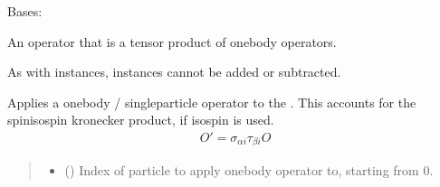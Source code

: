 \documentclass[letterpaper,10pt,english]{sphinxmanual}
\begin{document}
\begin{fulllineitems}
\label{\detokenize{spinbox:spinbox.core.ProductOperator}}
\pysigstartsignatures
{}
\pysigstopsignatures
\sphinxAtStartPar
Bases: 

\sphinxAtStartPar
An operator that is a tensor product of one\sphinxhyphen{}body operators.

\sphinxAtStartPar
As with  instances,  instances cannot be added or subtracted.

\begin{fulllineitems}
\label{\detokenize{spinbox:spinbox.core.ProductOperator.apply_onebody_operator}}
\pysigstartsignatures
{}
\pysigstopsignatures
\sphinxAtStartPar
Applies a one\sphinxhyphen{}body / single\sphinxhyphen{}particle operator to the .
This accounts for the spin\sphinxhyphen{}isospin kronecker product, if isospin is used.
\begin{equation*}
\begin{split}O' = \sigma_{\alpha i} \tau_{\beta i} O\end{split}
\end{equation*}\begin{quote}\begin{description}
\begin{itemize}
\item {} 
\sphinxAtStartPar
{} () \textendash{} Index of particle to apply onebody operator to, starting from 0.


\end{itemize}
\end{description}
\end{quote}
\end{fulllineitems}
\end{fulllineitems}
\end{document}
